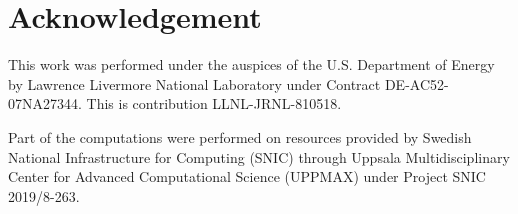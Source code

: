 \section*{Acknowledgement}

This work was performed under the auspices of the U.S. Department of Energy by Lawrence Livermore National Laboratory under Contract DE-AC52-07NA27344. This is contribution LLNL-JRNL-810518.

Part of the computations were performed on resources provided by Swedish National Infrastructure for Computing (SNIC) through Uppsala Multidisciplinary Center for Advanced Computational Science (UPPMAX) under Project SNIC 2019/8-263.
